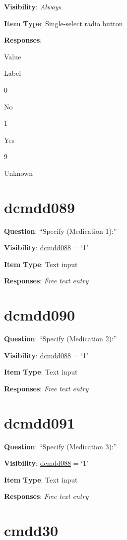 \documentclass[]{book}
\begin{document}
\textbf{Visibility}: \emph{Always}

\textbf{Item Type}: Single-select radio button

\textbf{Responses}:

Value

Label

0

No

1

Yes

9

Unknown

\hypertarget{dcmdd089}{%
\section{dcmdd089}\label{dcmdd089}}

\textbf{Question}: ``Specify (Medication 1):''

\textbf{Visibility}: \protect\hyperlink{dcmdd088}{dcmdd088} = `1'

\textbf{Item Type}: Text input

\textbf{Responses}: \emph{Free text entry}

\hypertarget{dcmdd090}{%
\section{dcmdd090}\label{dcmdd090}}

\textbf{Question}: ``Specify (Medication 2):''

\textbf{Visibility}: \protect\hyperlink{dcmdd088}{dcmdd088} = `1'

\textbf{Item Type}: Text input

\textbf{Responses}: \emph{Free text entry}

\hypertarget{dcmdd091}{%
\section{dcmdd091}\label{dcmdd091}}

\textbf{Question}: ``Specify (Medication 3):''

\textbf{Visibility}: \protect\hyperlink{dcmdd088}{dcmdd088} = `1'

\textbf{Item Type}: Text input

\textbf{Responses}: \emph{Free text entry}

\hypertarget{cmdd30}{%
\section{cmdd30}\label{cmdd30}}
\end{document}
